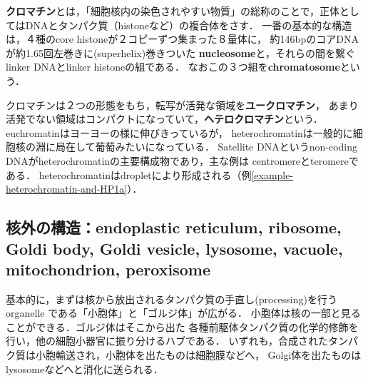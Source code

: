 \documentclass[uplatex, dvipdfmx]{jsreport}
\begin{document}
\begin{definition}[chromatin]
    \textbf{クロマチン}とは，「細胞核内の染色されやすい物質」の総称のことで，正体としてはDNAとタンパク質（histoneなど）の複合体をさす．
    一番の基本的な構造は，４種のcore histoneが２コピーずつ集まった８量体に，
    約146bpのコアDNAが約1.65回左巻きに(superhelix)巻きついた
    \textbf{nucleosome}と，それらの間を繋ぐlinker DNAとlinker histoneの組である．
    なおこの３つ組を\textbf{chromatosome}という．
\end{definition}
\begin{remark}
    クロマチンは２つの形態をもち，転写が活発な領域を\textbf{ユークロマチン}，
    あまり活発でない領域はコンパクトになっていて，\textbf{ヘテロクロマチン}という．
    euchromatinはヨーヨーの様に伸びきっているが，
    heterochromatinは一般的に細胞核の淵に局在して葡萄みたいになっている．
    Satellite DNAというnon-coding DNAがheterochromatinの主要構成物であり，主な例は
    centromereとteromereである．
    heterochromatinはdropletにより形成される（例\ref{example-heterochromatin-and-HP1a}）．
\end{remark}


\subsection{核外の構造：endoplastic reticulum, ribosome, Goldi body, Goldi vesicle, lysosome, vacuole, mitochondrion, peroxisome}
基本的に，まずは核から放出されるタンパク質の手直し(processing)を行うorganelle
である「小胞体」と「ゴルジ体」が広がる．
小胞体は核の一部と見ることができる．ゴルジ体はそこから出た
各種前駆体タンパク質の化学的修飾を行い，他の細胞小器官に振り分けるハブである．
いずれも，合成されたタンパク質は小胞輸送され，小胞体を出たものは細胞膜などへ，
Golgi体を出たものはlysosomeなどへと消化に送られる．
\end{document}
